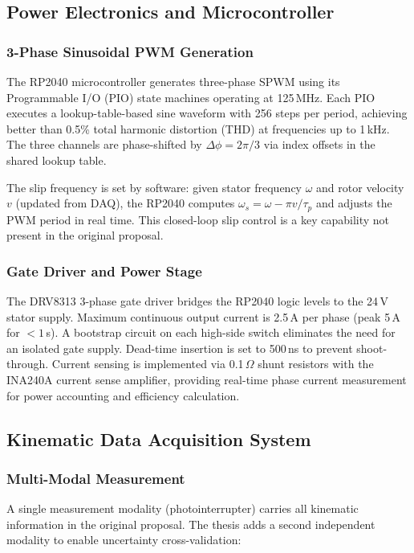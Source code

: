 \documentclass[12pt,letterpaper]{article}
\begin{document}
\subsection{Power Electronics and Microcontroller}

\subsubsection{3-Phase Sinusoidal PWM Generation}

The RP2040 microcontroller generates three-phase SPWM using its Programmable I/O
(PIO) state machines operating at 125\,MHz. Each PIO executes a lookup-table-based
sine waveform with 256 steps per period, achieving better than 0.5\% total harmonic
distortion (THD) at frequencies up to 1\,kHz. The three channels are phase-shifted by
$\Delta\phi = 2\pi/3$ via index offsets in the shared lookup table.

The slip frequency is set by software: given stator frequency $\omega$ and rotor
velocity $v$ (updated from DAQ), the RP2040 computes $\omega_s = \omega - \pi v/\tau_p$
and adjusts the PWM period in real time. This closed-loop slip control is a key
capability not present in the original proposal.

\subsubsection{Gate Driver and Power Stage}

The DRV8313 3-phase gate driver bridges the RP2040 logic levels to the 24\,V stator
supply. Maximum continuous output current is 2.5\,A per phase (peak 5\,A for
$< 1$\,s). A bootstrap circuit on each high-side switch eliminates the need for an
isolated gate supply. Dead-time insertion is set to 500\,ns to prevent shoot-through.
Current sensing is implemented via 0.1\,$\Omega$ shunt resistors with the INA240A
current sense amplifier, providing real-time phase current measurement for power
accounting and efficiency calculation.

\subsection{Kinematic Data Acquisition System}

\subsubsection{Multi-Modal Measurement}

A single measurement modality (photointerrupter) carries all kinematic information in
the original proposal. The thesis adds a second independent modality to enable
uncertainty cross-validation:
\end{document}
